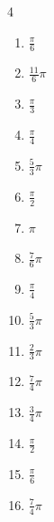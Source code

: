 \begin{multicols}{4}
\begin{enumerate}
  \item $\displaystyle \frac{\pi}{6}$

  \item $\displaystyle \frac{11}{6}\pi$

  \item $\displaystyle \frac{\pi}{3}$

  \item $\displaystyle \frac{\pi}{4}$

  \item $\displaystyle \frac{5}{3}\pi$

  \item $\displaystyle \frac{\pi}{2}$

  \item $\displaystyle \pi$

  \item $\displaystyle \frac{7}{6}\pi$

  \item $\displaystyle \frac{\pi}{4}$

  \item $\displaystyle \frac{5}{3}\pi$

  \item $\displaystyle \frac{2}{3}\pi$

\columnbreak %

  \item $\displaystyle \frac{7}{4}\pi$

  \item $\displaystyle \frac{3}{4}\pi$

  \item $\displaystyle \frac{\pi}{2}$

  \item $\displaystyle \frac{\pi}{6}$

  \item $\displaystyle \frac{7}{4}\pi$


\end{enumerate}
\end{multicols}
